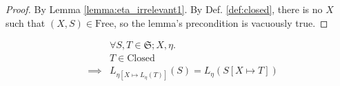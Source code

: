 \documentclass{llncs}
\renewcommand*{\S}{\mathfrak{S}}
\newcommand*{\Free}{\mathrm{Free}}
\newcommand*{\Closed}{\mathrm{Closed}}
\renewcommand*{\|}{\;|\;}
\begin{document}
\begin{proof}
  By Lemma \ref{lemma:eta_irrelevant1}. By Def. \ref{def:closed}, there
  is no $X$ such that $(X, S) \in \Free$, so the lemma's precondition
  is vacuously true.
\end{proof}


\begin{lemma}
  \label{lemma:substitution_trace_language}
  \begin{eqnarray*}
    &&         \forall S, T \in \S; X, \eta. \\
    &&         T \in \Closed \\
    &\implies& L_{\eta[X \mapsto L_\eta(T)]}(S) = L_\eta(S[X \mapsto T])
  \end{eqnarray*}
\end{lemma}
\end{document}
